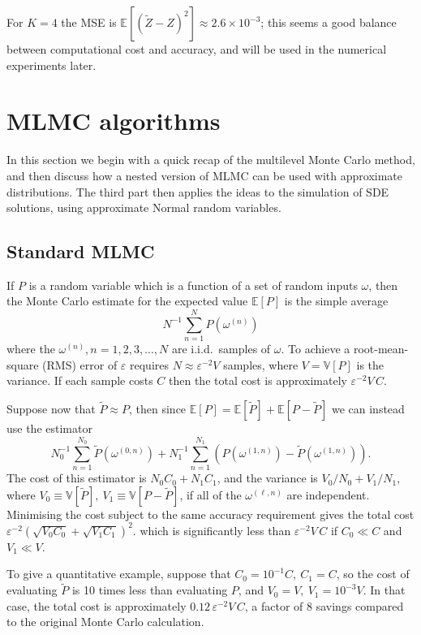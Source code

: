 \documentclass[review]{siamart190516}
\def \EE {{\mathbb{E}}}
\def \VV {{\mathbb{V}}}
\def \tP {{\widetilde{P}}}
\def \tZ {{\widetilde{Z}}}
\def\eps{{\varepsilon}}
\begin{document}
For $K\!=\!4$ the MSE is $\EE[(\tZ{-}Z)^2]\!\approx\! 2.6 \!\times\!10^{-3}$;
this seems a good balance between computational cost and accuracy,
and will be used in the numerical experiments later.


\section{MLMC algorithms}

In this section we begin with a quick recap of the multilevel Monte Carlo
method, and then discuss how a nested version of MLMC can be used with
approximate distributions. The third part then applies the ideas to the
simulation of SDE solutions, using approximate Normal random variables.

\subsection{Standard MLMC}

\label{sec:standard_MLMC}

If $P$ is a random variable which is a function of a set of random inputs
$\omega$, then the Monte Carlo estimate for the expected value $\EE[P]$ is
the simple average
\[
N^{-1} \sum_{n=1}^N P(\omega^{(n)})
\]
where the $\omega^{(n)}, n\!=\!1, 2, 3, \ldots, N$ are i.i.d.~samples of $\omega$.
To achieve a root-mean-square (RMS) error of $\eps$ requires
$\displaystyle
N \!\approx\! \eps^{-2} V
$
samples, where $V \!=\! \VV[P]$ is the variance.  If each sample costs $C$
then the total cost is approximately $\eps^{-2} V \, C$.

Suppose now that $\tP \approx P$, then since
$\displaystyle \EE[P] = \EE[\tP] + \EE[P{-} \tP]$
we can instead use the estimator
\[
N_0^{-1} \sum_{n=1}^{N_0} \tP(\omega^{(0,n)}) + 
N_1^{-1} \sum_{n=1}^{N_1} (P(\omega^{(1,n)}) - \tP(\omega^{(1,n)})).
\]
The cost of this estimator is $N_0 C_0 + N_1 C_1$, and 
the variance is $V_0 / N_0 + V_1 / N_1$, where
$V_0\equiv \VV[\tP], ~ V_1\equiv \VV[P{-}\tP]$, if all of 
the $\omega^{(\ell,n)}$ are independent.
Minimising the cost subject to the same accuracy requirement 
gives the total cost
$\displaystyle
\eps^{-2} (\sqrt{V_0C_0} + \sqrt{V_1C_1})^2.
$
which is significantly less than $\eps^{-2} V \, C$ if $C_0\ll C$ and $V_1\ll V$.

To give a quantitative example, suppose that
$C_0 \!=\! 10^{-1} C,\ C_1 \!=\! C$, so the cost of evaluating $\tP$ is
10 times less than evaluating $P$, and
$V_0 \!=\! V,\ V_1 \!=\! 10^{-3} V$.
In that case, the total cost is approximately $0.12\, \eps^{-2} V\, C$,
a factor of 8 savings compared to the original Monte Carlo calculation.
\end{document}
